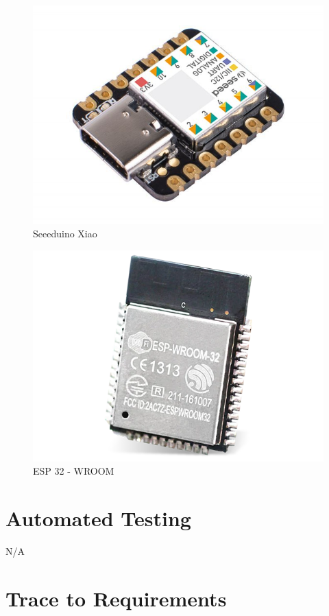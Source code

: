 \documentclass[12pt, titlepage]{article}
\begin{document}
\begin{figure}[H]
\centering
  \includegraphics[scale=0.4]{Seeeduino}
  \caption{Seeeduino Xiao}
  \label{fig:Seeeduino}
\end{figure}

\begin{figure}[H]
\centering
  \includegraphics[scale=0.4]{ESP}
  \caption{ESP 32 - WROOM}
  \label{fig:ESP}
\end{figure}


\section{Automated Testing}
N/A

\section{Trace to Requirements}
\end{document}
